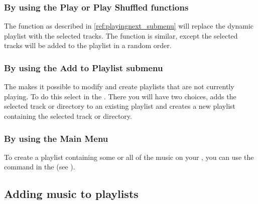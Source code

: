 
\subsubsection{By using the Play or Play Shuffled functions}
The  function as described in \ref{ref:playingnext_submenu}
will replace the dynamic playlist with the selected tracks. The  function is similar, except the selected tracks will be added to the
playlist in a random order.

\subsubsection{\label{ref:addtoplaylist_submenu}By using the Add to Playlist submenu}
The  makes it possible to modify and create
playlists that are not currently playing. To do this select 
in the . There you will have two choices,
 adds the selected track or directory to an existing
playlist and  creates a new playlist containing
the selected track or directory.


\subsubsection{By using the Main Menu}
To create a playlist containing some or all of the music on your \dap{}, you can use the
 command in the 
(see ).

\subsection{Adding music to playlists}

